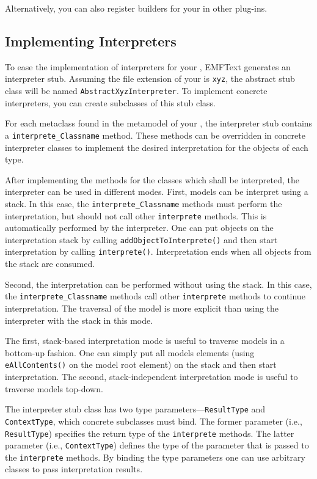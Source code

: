 Alternatively, you can also register builders for your \DSL in other plug-ins.

\subsection{Implementing Interpreters}
\label{sec:cust_interpreters}

To ease the implementation of interpreters for your \DSL, EMFText generates an
interpreter stub. Assuming the file extension of your \DSL is \texttt{xyz}, the
abstract stub class will be named \texttt{AbstractXyzInterpreter}. To implement
concrete interpreters, you can create subclasses of this stub class.

For each metaclass found in the metamodel of your \DSL, the interpreter
stub contains a \texttt{interprete\_Classname} method. These methods can be
overridden in concrete interpreter classes to implement the desired interpretation for the
objects of each type.

After implementing the methods for the classes which shall be interpreted, the
interpreter can be used in different modes. First, models can be interpret using
a stack. In this case, the \texttt{interprete\_Classname} methods must
perform the interpretation, but should not call other
\texttt{interprete} methods. This is automatically performed by the
interpreter. One can put objects on the interpretation stack by calling
\texttt{addObjectToInterprete()} and then start
interpretation by calling \texttt{interprete()}. Interpretation ends
when all objects from the stack are consumed.

Second, the interpretation can be performed without using the stack. In this
case, the \texttt{interprete\_Classname} methods call other
\texttt{interprete} methods to continue interpretation. The traversal of the
model is more explicit than using the interpreter with the stack in this mode.

The first, stack-based interpretation mode is useful to traverse models in a
bottom-up fashion. One can simply put all models elements (using
\texttt{eAllContents()} on the model root element) on the stack and then start
interpretation. The second, stack-independent interpretation mode is useful to
traverse models top-down.

The interpreter stub class has two type parameters---\texttt{ResultType} and
\texttt{ContextType}, which concrete subclasses must bind. The former
parameter (i.e., \texttt{ResultType}) specifies the return type of the
\texttt{interprete} methods. The latter parameter (i.e., \texttt{ContextType})
defines the type of the parameter that is passed to the \texttt{interprete}
methods. By binding the type parameters one can use arbitrary classes to pass
interpretation results.

